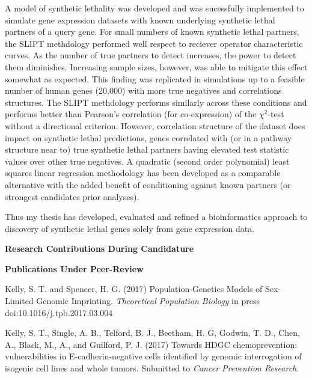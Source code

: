 A model of synthetic lethality was developed and was sucessfully implemented to simulate gene expression datasets with known underlying synthetic lethal partners of a query gene. For small numbers of known synthetic lethal partners, the SLIPT methdology performed well respect to reciever operator characteristic curves. As the number of true partners to detect increases, the power to detect them diminishes. Increasing sample sizes, however, was able to mitigate this effect somewhat as expected. This finding was replicated in simulations up to a feasible number of human genes (20,000) with more true negatives and correlations structures. The SLIPT methdology performs similarly across these conditions and performs better than Pearson's correlation (for co-expression) of the $\chi^2$-test without a directional criterion.  However, correlation structure of the dataset does impact on synthetic lethal predictions, genes correlated with (or in a pathway structure near to) true synthetic lethal partners having elevated test statistic values over other true negatives. A quadratic (second order polynomial) least squares linear regression methodology has been developed as a comparable alternative with the added benefit of conditioning against known partners (or strongest candidates prior analyses).


Thus my thesis has developed, evaluated and refined a bioinformatics approach to discovery of synthetic lethal genes solely from gene expression data.  

\clearpage

\begin{center}
 \textbf{Research Contributions During Candidature}
\end{center}

\textbf{Publications Under Peer-Review}

 
Kelly, S. T. and Spencer, H. G. (2017) Population-Genetics Models of Sex-Limited Genomic Imprinting. \textit{Theoretical Population Biology} in press doi:10.1016/j.tpb.2017.03.004

Kelly, S. T., Single, A. B., Telford, B. J., Beetham, H. G, Godwin, T. D., Chen, A., Black, M., A., and Guilford, P. J. (2017) Towards HDGC chemoprevention: vulnerabilities in E-cadherin-negative cells identified by genomic interrogation of isogenic cell lines and whole tumors.  Submitted to \textit{Cancer Prevention Research}.

